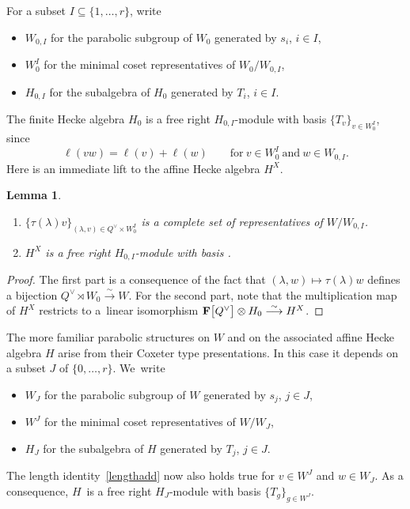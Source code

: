 \documentclass[pdftex]{sigma}
\numberwithin{equation}{section}
\newtheorem{Lemma}[Theorem]{Lemma}
\begin{document}
For a subset $I\subseteq\{1,\dots,r\}$, write
\begin{itemize}\itemsep=0pt
\item $W_{0,I}$ for the parabolic subgroup of $W_0$ generated by $s_i$, $i\in I$,
\item $W_0^I$ for the minimal coset representatives of $W_0/W_{0,I}$,
\item $H_{0,I}$ for the subalgebra of $H_0$ generated by $T_i$, $i\in I$.
\end{itemize}
The finite Hecke algebra $H_0$ is a free right $H_{0,I}$-module with basis $\{T_v\}_{v\in W_0^I}$, since
\begin{equation}\label{lengthadd}
\ell(vw)=\ell(v)+\ell(w)\qquad \text{for}\ v\in W_0^I \ \text{and}\ w\in W_{0,I}.
\end{equation}
Here is an immediate lift to the affine Hecke algebra $H^X$.
\begin{Lemma}\label{lemfree}\hfill
\begin{enumerate}\itemsep=0pt
\item[$(1)$]
$\{\tau(\lambda)v\}_{(\lambda,v)\in Q^\vee\times W_0^I}$ is a complete set of representatives of $W/W_{0,I}$.
\item[$(2)$] $H^X$ is a free right $H_{0,I}$-module with
basis .
\end{enumerate}
\end{Lemma}
\begin{proof}
The first part is a consequence of the fact that $(\lambda,w)\mapsto \tau(\lambda)w$ defines a bijection $Q^\vee\rtimes W_0\overset{\sim}{\longrightarrow} W$. For the second part, note that the multiplication map of $H^X$ restricts to
a~linear isomorphism $\mathbf{F}\smash{\bigl[Q^\vee\bigr]}\otimes H_0\overset{\sim}{\longrightarrow} H^X$.
\end{proof}

The more familiar parabolic structures on $W$ and on the associated affine Hecke algebra $H$ arise from their Coxeter type presentations. In this case it depends on a subset $J$ of $\{0,\dots,r\}$. We~write
\begin{itemize}\itemsep=0pt
\item $W_{J}$ for the parabolic subgroup of $W$ generated by $s_j$, $j\in J$,
\item $W^J$ for the minimal coset representatives of $W/W_{J}$,
\item $H_{J}$ for the subalgebra of $H$ generated by $T_j$, $j\in J$.
\end{itemize}
The length identity~\eqref{lengthadd} now also holds true for $v\in W^J$ and $w\in W_J$. As a consequence, $H$~is a free right $H_J$-module with basis
$\{T_g\}_{g\in W^J}$.
\end{document}
